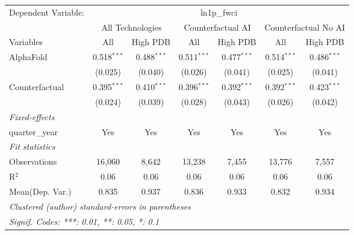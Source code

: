 \begingroup
\centering
\begin{tabular}{lcccccc}
   \tabularnewline \midrule \midrule
   Dependent Variable: & \multicolumn{6}{c}{ln1p\_fwci}\\
 & \multicolumn{2}{c}{All Technologies} & \multicolumn{2}{c}{Counterfactual AI} & \multicolumn{2}{c}{Counterfactual No AI} \\
\cmidrule(lr){1-1}\cmidrule(lr){2-3} \cmidrule(lr){4-5} \cmidrule(lr){6-7}
Variables & \multicolumn{1}{c}{All} & \multicolumn{1}{c}{High PDB} & \multicolumn{1}{c}{All} & \multicolumn{1}{c}{High PDB} & \multicolumn{1}{c}{All} & \multicolumn{1}{c}{High PDB} \\
\cmidrule(lr){1-1}\cmidrule(lr){2-2} \cmidrule(lr){3-3} \cmidrule(lr){4-4} \cmidrule(lr){5-5} \cmidrule(lr){6-6} \cmidrule(lr){7-7}
   AlphaFold      & 0.518$^{***}$ & 0.488$^{***}$ & 0.511$^{***}$ & 0.477$^{***}$ & 0.514$^{***}$ & 0.486$^{***}$\\   
                  & (0.025)       & (0.040)       & (0.026)       & (0.041)       & (0.025)       & (0.041)\\   
   Counterfactual & 0.395$^{***}$ & 0.410$^{***}$ & 0.396$^{***}$ & 0.392$^{***}$ & 0.392$^{***}$ & 0.423$^{***}$\\   
                  & (0.024)       & (0.039)       & (0.028)       & (0.043)       & (0.026)       & (0.042)\\   
   \midrule
   \emph{Fixed-effects}\\
   quarter\_year  & Yes           & Yes           & Yes           & Yes           & Yes           & Yes\\  
   \midrule
   \emph{Fit statistics}\\
   Observations   & 16,060        & 8,642         & 13,238        & 7,455         & 13,776        & 7,557\\  
   R$^2$          & 0.06          & 0.06          & 0.06          & 0.06          & 0.06          & 0.06\\  
Mean(Dep. Var.) & 0.835 & 0.937 & 0.836 & 0.933 & 0.832 & 0.934 \\
   \midrule \midrule
   \multicolumn{7}{l}{\emph{Clustered (author) standard-errors in parentheses}}\\
   \multicolumn{7}{l}{\emph{Signif. Codes: ***: 0.01, **: 0.05, *: 0.1}}\\
\end{tabular}
\par\endgroup
